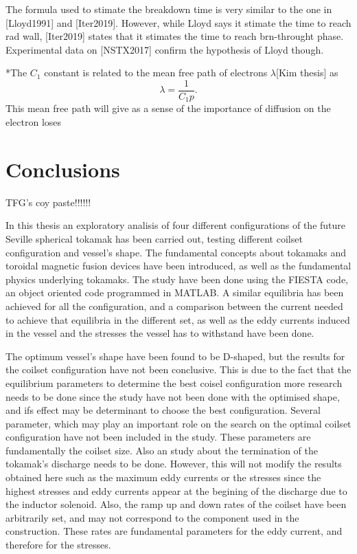 \documentclass[a4paper,12pt,oneside]{book}
\begin{document}
The formula used to stimate the breakdown time is very similar to the one in [Lloyd1991] and [Iter2019]. However, while Lloyd says it stimate the time to reach rad wall, [Iter2019] states that it stimates the time to reach brn-throught phase. Experimental data on [NSTX2017] confirm the hypothesis of Lloyd though.

*The $C_1$ constant is related to the mean free path of electrons $\lambda$[Kim thesis] as
\begin{equation}
\lambda= \dfrac{1}{C_1 p}.
\end{equation}
This mean free path will give as a sense of the importance of diffusion on the electron loses

\chapter{Conclusions}

TFG's coy paste!!!!!!

In this thesis an exploratory analisis of four different configurations of the future Seville spherical tokamak has been carried out, testing different coilset configuration and vessel's shape. The fundamental concepts about tokamaks and toroidal magnetic fusion devices have been introduced, as well as the fundamental physics underlying tokamaks. The study have been done using the FIESTA code, an object oriented code programmed in MATLAB. A similar equilibria has been achieved for all the configuration, and a comparison between the current needed to achieve that equilibria in the different set, as well as the eddy currents induced in the vessel and the stresses the vessel has to withstand have been done.

The optimum vessel's shape have been found to be D-shaped, but the results for the coilset configuration have not been conclusive. This is due to the fact that the equilibrium parameters to determine the best coisel configuration more research needs to be done since the study have not been done with the optimised shape, and ifs effect may be determinant to choose the best configuration. Several parameter, which may play an important role on the search on the optimal coilset configuration have not been included in the study. These parameters are fundamentally the coilset size. Also an study about the termination of the tokamak's discharge needs to be done. However, this will not modify the results obtained here such as the maximum eddy currents or the stresses since the highest stresses and eddy currents appear at the begining of the discharge due to the inductor solenoid. Also, the ramp up and down rates of the coilset have been arbitrarily set, and may not correspond to the component used in the construction. These rates are fundamental parameters for the eddy current, and therefore for the stresses.
\end{document}
